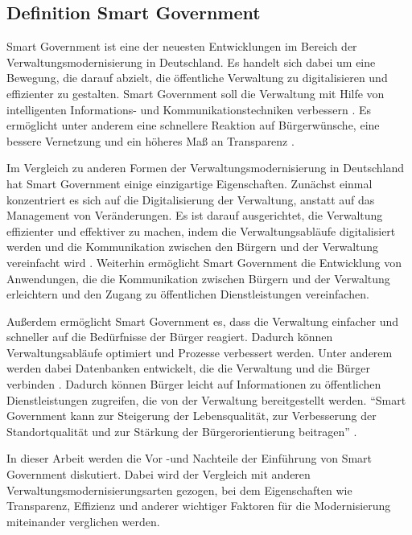 \subsection{Definition Smart Government}
Smart Government ist eine der neuesten Entwicklungen im Bereich der Verwaltungsmodernisierung in Deutschland. 
Es handelt sich dabei um eine Bewegung, die darauf abzielt, die öffentliche Verwaltung zu digitalisieren und effizienter zu gestalten. 
Smart Government soll die Verwaltung mit Hilfe von intelligenten Informations- und Kommunikationstechniken verbessern \citep[][S.178]{von_Lucke_2016}.
Es ermöglicht unter anderem eine schnellere Reaktion auf Bürgerwünsche, eine bessere Vernetzung und ein höheres Maß an Transparenz \citep[Vgl][S.87]{Kersting2017}.
\par
Im Vergleich zu anderen Formen der Verwaltungsmodernisierung in Deutschland hat Smart Government einige einzigartige Eigenschaften. 
Zunächst einmal konzentriert es sich auf die Digitalisierung der Verwaltung, anstatt auf das Management von Veränderungen. 
Es ist darauf ausgerichtet, die Verwaltung effizienter und effektiver zu machen, indem die Verwaltungsabläufe digitalisiert werden und die Kommunikation zwischen den Bürgern und der Verwaltung vereinfacht wird \citep[Vgl.][]{von_Lucke_2016}.
Weiterhin ermöglicht Smart Government die Entwicklung von Anwendungen, die die Kommunikation zwischen Bürgern und der Verwaltung erleichtern und den Zugang zu öffentlichen Dienstleistungen vereinfachen. 
\par
Außerdem ermöglicht Smart Government es, dass die Verwaltung einfacher und schneller auf die Bedürfnisse der Bürger reagiert. 
Dadurch können Verwaltungsabläufe optimiert und Prozesse verbessert werden. 
Unter anderem werden dabei Datenbanken entwickelt, die die Verwaltung und die Bürger verbinden \citep[Vgl.][]{von_Lucke_2016}. 
Dadurch können Bürger leicht auf Informationen zu öffentlichen Dienstleistungen zugreifen, die von der Verwaltung bereitgestellt werden.
``Smart Government kann zur Steigerung der Lebensqualität, zur Verbesserung der Standortqualität und zur Stärkung der Bürgerorientierung beitragen'' \citep[][]{von_Lucke_2016}. 
\par
In dieser Arbeit werden die Vor -und Nachteile der Einführung von Smart Government diskutiert.
Dabei wird der Vergleich mit anderen Verwaltungsmodernisierungsarten gezogen, bei dem Eigenschaften wie Transparenz, Effizienz und anderer wichtiger Faktoren für die Modernisierung miteinander verglichen werden.
